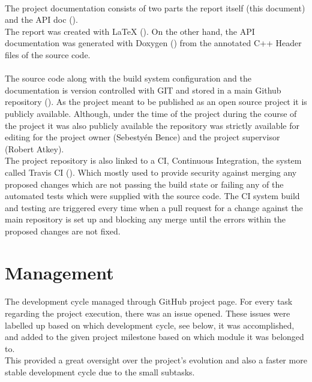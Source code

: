 \documentclass[]{report}
\begin{document}
\paragraph{ }
The project documentation consists of two parts the report itself (this document) and the API doc (\cite{APID}).
\\
The report was created with LaTeX (\cite{LATX}). On the other hand, the API documentation was generated with Doxygen (\cite{DOXY}) from the annotated C++ Header files of the source code.

\paragraph{ }
The source code along with the build system configuration and the documentation is version controlled with GIT and stored in a main  Github repository (\cite{REPO}).
As the project meant to be published as an open source project it is publicly available. Although, under the time of the project during the course of the project it was also publicly available the repository was strictly available for editing for the project owner (Sebestyén Bence) and the project supervisor (Robert Atkey).
\\
The project repository is also linked to a CI, Continuous Integration, the system called Travis CI (\cite{TRAV}). Which mostly used to provide security against merging any proposed changes which are not passing the build state or failing any of the automated tests which were supplied with the source code. The CI system build and testing are triggered every time when a pull request for a change against the main repository is set up and blocking any merge until the errors within the proposed changes are not fixed.



\section{Management}

\paragraph{ }
The development cycle managed through GitHub project page. For every task regarding the project execution, there was an issue opened. These issues were labelled up based on which development cycle, see below, it was accomplished, and added to the given project milestone based on which module it was belonged to.
\\
This provided a great oversight over the project's evolution and also a faster more stable development cycle due to the small subtasks.
\end{document}
